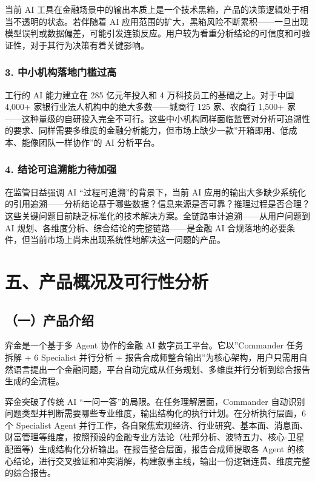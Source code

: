 \documentclass[
]{ctexart}
\begin{document}
当前 AI
工具在金融场景中的输出本质上是一个技术黑箱，产品的决策逻辑处于相当不透明的状态。若伴随着
AI
应用范围的扩大，黑箱风险不断累积------一旦出现模型误判或数据偏差，可能引发连锁反应。用户较为看重分析结论的可信度和可验证性，对于其行为决策有着关键影响。

\subsubsection{3.
中小机构落地门槛过高}\label{ux4e2dux5c0fux673aux6784ux843dux5730ux95e8ux69dbux8fc7ux9ad8}

工行的 AI 能力建立在 285 亿元年投入和 4 万科技员工的基础之上。对于中国
4,000+ 家银行业法人机构中的绝大多数------城商行 125 家、农商行 1,500+
家------这种量级的自研投入完全不可行。这些中小机构同样面临监管对分析可追溯性的要求、同样需要多维度的金融分析能力，但市场上缺少一款''开箱即用、低成本、能像团队一样协作''的
AI 分析平台。

\subsubsection{4.
结论可追溯能力待加强}\label{ux7ed3ux8bbaux53efux8ffdux6eafux80fdux529bux5f85ux52a0ux5f3a}

在监管日益强调 AI ``过程可追溯''的背景下，当前 AI
应用的输出大多缺少系统化的引用追溯------分析结论基于哪些数据？信息来源是否可靠？推理过程是否合理？这些关键问题目前缺乏标准化的技术解决方案。全链路审计追溯------从用户问题到
AI 规划、各维度分析、综合结论的完整链路------是金融 AI
合规落地的必要条件，但当前市场上尚未出现系统性地解决这一问题的产品。

\section{五、产品概况及可行性分析}\label{ux4e94ux4ea7ux54c1ux6982ux51b5ux53caux53efux884cux6027ux5206ux6790}

\subsection{（一）产品介绍}\label{ux4e00ux4ea7ux54c1ux4ecbux7ecd}

弈金是一个基于多 Agent 协作的金融 AI 数字员工平台。它以''Commander
任务拆解 + 6 Specialist 并行分析 +
报告合成师整合输出''为核心架构，用户只需用自然语言提出一个金融问题，平台自动完成从任务规划、多维度并行分析到综合报告生成的全流程。

弈金突破了传统 AI ``一问一答''的局限。在任务理解层面，Commander
自动识别问题类型并判断需要哪些专业维度，输出结构化的执行计划。在分析执行层面，6
个 Specialist Agent
并行工作，各自聚焦宏观经济、行业研究、基本面、消息面、财富管理等维度，按照预设的金融专业方法论（杜邦分析、波特五力、核心-卫星配置等）生成结构化分析输出。在报告整合层面，报告合成师提取各
Agent
的核心结论，进行交叉验证和冲突消解，构建叙事主线，输出一份逻辑连贯、维度完整的综合报告。
\end{document}
